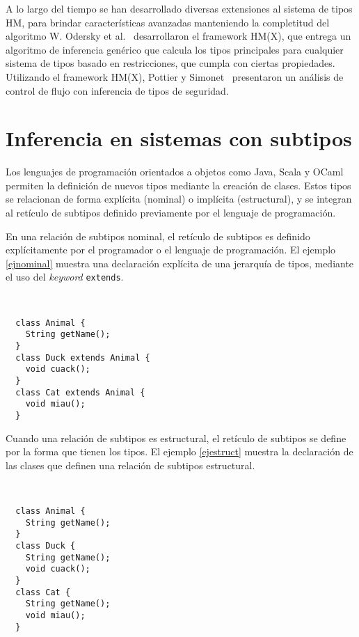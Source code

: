A lo largo del tiempo se han desarrollado diversas extensiones al sistema de tipos HM, para brindar características avanzadas manteniendo la completitud del algoritmo W. Odersky et al.~\cite{odersky} desarrollaron el framework HM(X), que entrega un algoritmo de inferencia genérico que calcula los tipos principales para cualquier sistema de tipos basado en restricciones, que cumpla con ciertas propiedades. Utilizando el framework HM(X), Pottier y Simonet~\cite{Pottier} presentaron un análisis de control de flujo con inferencia de tipos de seguridad.

\section{Inferencia en sistemas con subtipos}
Los lenguajes de programación orientados a objetos como Java, Scala y OCaml permiten la definición de nuevos tipos mediante la creación de clases. Estos tipos se relacionan de forma explícita (nominal) o implícita (estructural), y se integran al retículo de subtipos definido previamente por el lenguaje de programación.

En una relación de subtipos nominal, el retículo de subtipos es definido explícitamente por el programador o el lenguaje de programación. El ejemplo \ref{ejnominal} muestra una declaración explícita de una jerarquía de tipos, mediante el uso del \emph{keyword} \texttt{extends}.

\begin{ej} \ \\
  \normalfont
  \label{ejnominal}
\begin{lstlisting}
  class Animal {
    String getName();
  }
  class Duck extends Animal {
    void cuack();
  }
  class Cat extends Animal {
    void miau();
  }
\end{lstlisting}
\end{ej}

Cuando una relación de subtipos es estructural, el retículo de subtipos se define por la forma que tienen los tipos. El ejemplo \ref{ejestruct} muestra la declaración de las clases que definen una relación de subtipos estructural.

\begin{ej} \ \\
  \normalfont
  \label{ejestruct}
\begin{lstlisting}
  class Animal {
    String getName();
  }
  class Duck {
    String getName();
    void cuack();
  }
  class Cat {
    String getName();
    void miau();
  }
\end{lstlisting}
\end{ej}

